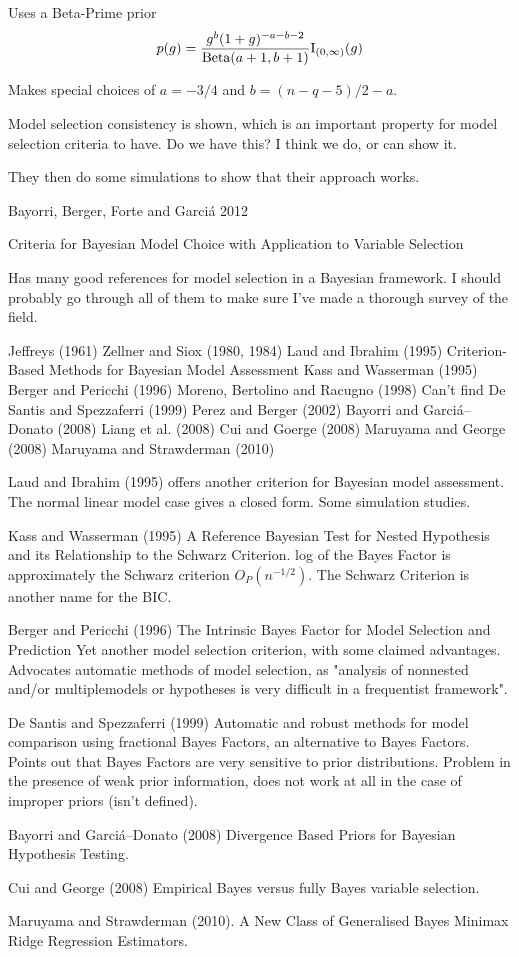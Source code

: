 \documentclass{amsart}[12pt]
\begin{document}
Uses a Beta-Prime prior
\[
p(g) = \frac{g^b (1 + g)^{-a-b-2}}{\text{Beta}(a + 1, b + 1)} \text{I}_{(0, \infty)}(g)
\]

Makes special choices of $a = -3/4$ and $b = (n - q - 5)/2 - a$.

Model selection consistency is shown, which is an important property for model selection criteria to have. Do
we have this? I think we do, or can show it.

They then do some simulations to show that their approach works.

Bayorri, Berger, Forte and Garci\'{a} 2012

Criteria for Bayesian Model Choice with Application to Variable Selection

Has many good references for model selection in a Bayesian framework. I should probably go through all of them
to make sure I've made a thorough survey of the field.

Jeffreys (1961)
Zellner and Siox (1980, 1984)
Laud and Ibrahim (1995) Criterion-Based Methods for Bayesian Model Assessment
Kass and Wasserman (1995)
Berger and Pericchi (1996)
Moreno, Bertolino and Racugno (1998) Can't find
De Santis and Spezzaferri (1999)
Perez and Berger (2002)
Bayorri and Garci\'{a}--Donato (2008)
Liang et al. (2008)
Cui and Goerge (2008)
Maruyama and George (2008)
Maruyama and Strawderman (2010)

Laud and Ibrahim (1995) offers another criterion for Bayesian model assessment. The normal linear model case
gives a closed form. Some simulation studies.

Kass and Wasserman (1995) A Reference Bayesian Test for Nested Hypothesis and its Relationship to the
Schwarz Criterion. log of the Bayes Factor is approximately the Schwarz criterion $O_P(n^{-1/2})$. The
Schwarz Criterion is another name for the BIC.

Berger and Pericchi (1996) The Intrinsic Bayes Factor for Model Selection and Prediction
Yet another model selection criterion, with some claimed advantages. Advocates automatic methods of model 
selection, as "analysis of nonnested and/or multiplemodels or hypotheses is very difficult in a frequentist
framework".

De Santis and Spezzaferri (1999) Automatic and robust methods for model comparison using fractional Bayes
Factors, an alternative to Bayes Factors. Points out that Bayes Factors are very sensitive to prior
distributions. Problem in the presence of weak prior information, does not work at all in the case of improper
priors (isn't defined).

Bayorri and Garci\'{a}--Donato (2008) Divergence Based Priors for Bayesian Hypothesis Testing.

Cui and George (2008) Empirical Bayes versus fully Bayes variable selection.

Maruyama and Strawderman (2010). A New Class of Generalised Bayes Minimax Ridge Regression Estimators.
\end{document}
